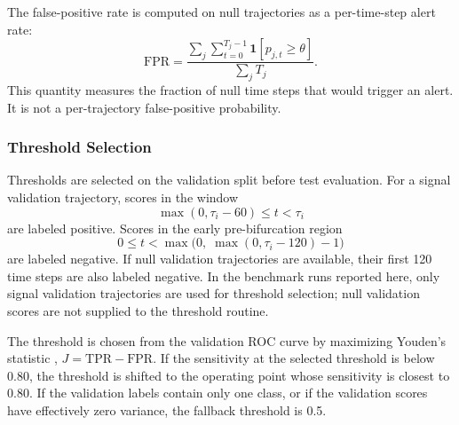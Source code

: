 The false-positive rate is computed on null trajectories as a per-time-step
alert rate:
\[
  \mathrm{FPR} =
  \frac{\sum_j \sum_{t=0}^{T_j-1} \mathbf{1}[p_{j,t} \geq \theta]}
       {\sum_j T_j}.
\]
This quantity measures the fraction of null time steps that would trigger an
alert. It is not a per-trajectory false-positive probability.

\subsubsection{Threshold Selection}
\label{sec:metrics:threshold}

Thresholds are selected on the validation split before test evaluation. For a
signal validation trajectory, scores in the window
\[
  \max(0,\tau_i - 60) \leq t < \tau_i
\]
are labeled positive. Scores in the early pre-bifurcation region
\[
  0 \leq t < \max\bigl(0,\; \max(0,\tau_i - 120) - 1\bigr)
\]
are labeled negative. If null validation trajectories are available, their
first 120 time steps are also labeled negative. In the benchmark runs
reported here, only signal validation trajectories are used for threshold
selection; null validation scores are not supplied to the threshold routine.

The threshold is chosen from the validation ROC curve by maximizing Youden's
statistic \citep{youden1950index}, \(J = \mathrm{TPR} - \mathrm{FPR}\). If
the sensitivity at the selected threshold is below 0.80, the threshold is
shifted to the operating point whose sensitivity is closest to 0.80. If the
validation labels contain only one class, or if the validation scores have
effectively zero variance, the fallback threshold is 0.5.
